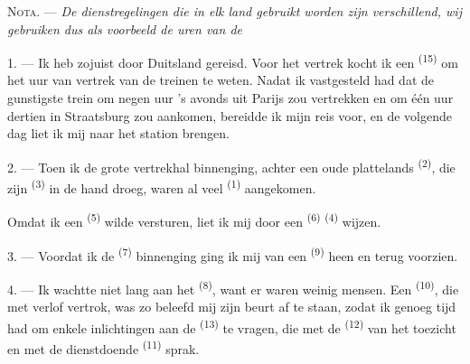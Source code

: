 
\VUsaut{4.0mm}
\VUsaut{2.4mm}
\VUsaut{3.4mm}
\textsc{Nota.} --- \textit{De dienstregelingen die in elk land gebruikt worden zijn
verschillend, wij gebruiken dus als voorbeeld de uren van de}

1. --- Ik heb zojuist door Duitsland gereisd. Voor het vertrek kocht ik een
 \textsuperscript{(15)} om het uur van vertrek van de treinen
te weten. Nadat ik vastgesteld had dat de gunstigste trein om negen uur 's avonds uit Parijs
zou vertrekken en om één uur dertien in Straatsburg zou aankomen, bereidde ik mijn reis voor,
en de volgende dag liet ik mij naar het station brengen.

2. --- Toen ik de grote vertrekhal binnenging, achter een oude plattelands
\textsuperscript{(2)}, die zijn  \textsuperscript{(3)} in de hand droeg, waren
al veel  \textsuperscript{(1)} aangekomen.

Omdat ik een  \textsuperscript{(5)} wilde versturen, liet ik mij door een
 \textsuperscript{(6)}  \textsuperscript{(4)}
wijzen.

3. --- Voordat ik de  \textsuperscript{(7)} binnenging ging ik mij van een
 \textsuperscript{(9)} heen en terug voorzien.

4. --- Ik wachtte niet lang aan het  \textsuperscript{(8)}, want er waren weinig
mensen. Een  \textsuperscript{(10)}, die met verlof vertrok, was zo beleefd
mij zijn beurt af te staan, zodat ik genoeg tijd had om enkele inlichtingen aan de
 \textsuperscript{(13)} te vragen, die met de 
\textsuperscript{(12)} van het toezicht en met de dienstdoende 
\textsuperscript{(11)} sprak.

\VUsaut{3.0mm}

